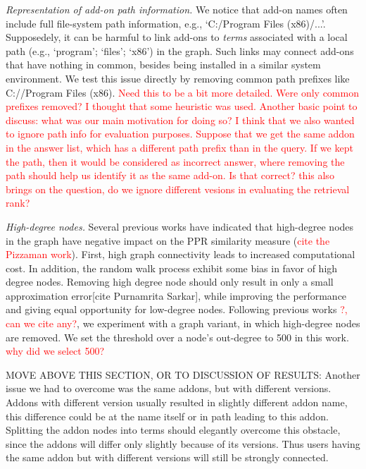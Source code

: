 \documentclass[11pt,oneside]{book}
\begin{document}
{\it Representation of add-on path information.} We notice that add-on
names often include full file-system path information, e.g.,
`C:/Program Files (x86)/...'. Supposedely, it can be harmful to link
add-ons to {\it terms} associated with a local path (e.g., `program';
`files'; `x86') in the graph. Such links may connect add-ons that have
nothing in common, besides being installed in a similar system
environment. We test this issue directly by removing common path
prefixes like C://Program Files (x86). \textcolor{red}{Need this to be
  a bit more detailed. Were only common prefixes removed? I thought
  that some heuristic was used. Another basic point to discuss: what was our main motivation for doing so? I think that we also wanted to ignore path info for evaluation purposes. Suppose that we get the same addon in the answer list, which has a different path prefix than in the query. If we kept the path, then it would be considered as incorrect answer, where removing the path should help us identify it as the same add-on. Is that correct? this also brings on the question, do we ignore different vesions in evaluating the retrieval rank?} 

{\it High-degree nodes.} Several previous works have indicated that
high-degree nodes in the graph have negative impact on the PPR
similarity measure (\textcolor{red}{cite the Pizzaman work}). First,
high graph connectivity leads to increased computational cost. In
addition, the random walk process exhibit some bias in favor of high
degree nodes. Removing high degree node should only result in only a
small approximation error[cite Purnamrita Sarkar], while improving the
performance and giving equal opportunity for low-degree
nodes. Following previous works \textcolor{red}{?, can we cite any?},
we experiment with a graph variant, in which high-degree nodes are
removed. We set the threshold over a node's out-degree to 500 in this
work. \textcolor{red}{why did we select 500?}


MOVE ABOVE THIS SECTION, OR TO DISCUSSION OF RESULTS: Another issue we had to overcome was
the same addons, but with different versions. Addons with different
version usually resulted in slightly different addon name, this
difference could be at the name itself or in path leading to this
addon. Splitting the addon nodes into terms should elegantly overcome
this obstacle, since the addons will differ only slightly because of
its versions. Thus users having the same addon but with different
versions will still be strongly connected.
\end{document}
